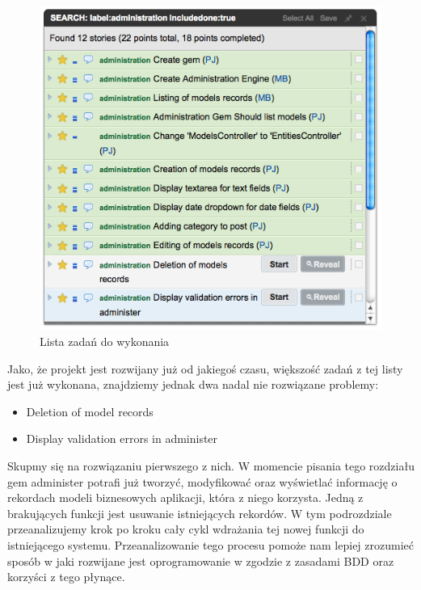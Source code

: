     \begin{figure}
  		\begin{center}
  			\includegraphics[width=\linewidth]{images/administer_stories_list.png}
  			\caption{Lista zadań do wykonania}
  			\label{administer_stories}
  		\end{center}
  	\end{figure}
  	
    Jako, że projekt jest rozwijany już od jakiegoś czasu, większość zadań z tej listy jest już wykonana, znajdziemy jednak dwa nadal nie rozwiązane problemy:
    
    \begin{itemize}
      \item Deletion of model records
      \item Display validation errors in administer
    \end{itemize}
    
    Skupmy się na rozwiązaniu pierwszego z nich. W momencie pisania tego rozdziału gem administer potrafi już tworzyć, modyfikować oraz wyświetlać informację o rekordach modeli biznesowych aplikacji, która z niego korzysta. Jedną z brakujących funkcji jest usuwanie istniejących rekordów. W tym podrozdziale przeanalizujemy krok po kroku cały cykl wdrażania tej nowej funkcji do istniejącego systemu. Przeanalizowanie tego procesu pomoże nam lepiej zrozumieć sposób w jaki rozwijane jest oprogramowanie w zgodzie z zasadami BDD oraz korzyści z tego płynące.
    
